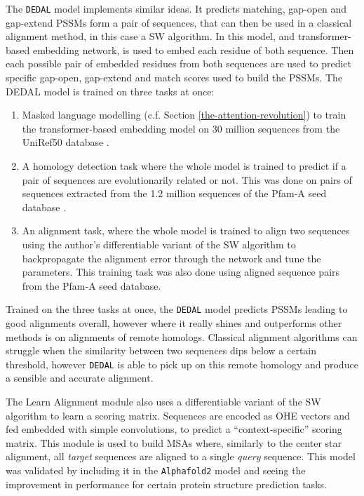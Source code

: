 \documentclass[
  11pt,
  twoside,
  BCOR=10mm,
  listof=totoc]{scrbook}
\providecommand{\tightlist}{%
  \setlength{\itemsep}{0pt}\setlength{\parskip}{0pt}}
\begin{document}
The \texttt{DEDAL} model \autocite{llinares-lopezDeepEmbeddingAlignment2022} implements similar ideas. It predicts matching, gap-open and gap-extend PSSMs form a pair of sequences, that can then be used in a classical alignment method, in this case a SW algorithm. In this model, and transformer-based embedding network, is used to embed each residue of both sequence. Then each possible pair of embedded residues from both sequences are used to predict specific gap-open, gap-extend and match scores used to build the PSSMs. The DEDAL model is trained on three tasks at once:

\begin{enumerate}
\def\labelenumi{\arabic{enumi}.}
\tightlist
\item
  Masked language modelling (c.f. Section \ref{the-attention-revolution}) to train the transformer-based embedding model on 30 million sequences from the UniRef50 database \autocite{suzekUniRefClustersComprehensive2015}.
\item
  A homology detection task where the whole model is trained to predict if a pair of sequences are evolutionarily related or not. This was done on pairs of sequences extracted from the 1.2 million sequences of the Pfam-A seed database \autocite{mistryPfamProteinFamilies2021}.
\item
  An alignment task, where the whole model is trained to align two sequences using the author's differentiable variant of the SW algorithm to backpropagate the alignment error through the network and tune the parameters. This training task was also done using aligned sequence pairs from the Pfam-A seed database.
\end{enumerate}

Trained on the three tasks at once, the \texttt{DEDAL} model predicts PSSMs leading to good alignments overall, however where it really shines and outperforms other methods is on alignments of remote homologs. Classical alignment algorithms can struggle when the similarity between two sequences dips below a certain threshold, however \texttt{DEDAL} is able to pick up on this remote homology and produce a sensible and accurate alignment.

The Learn Alignment module \autocite{pettiEndtoendLearningMultiple2022} also uses a differentiable variant of the SW algorithm to learn a scoring matrix. Sequences are encoded as OHE vectors and fed embedded with simple convolutions, to predict a ``context-specific'' scoring matrix. This module is used to build MSAs where, similarly to the center star alignment, all \emph{target} sequences are aligned to a single \emph{query} sequence. This model was validated by including it in the \texttt{Alphafold2} model and seeing the improvement in performance for certain protein structure prediction tasks.
\end{document}
